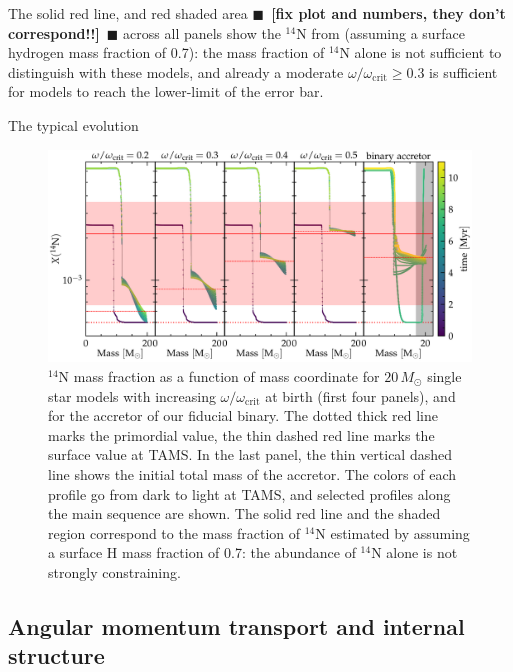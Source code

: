 \documentclass[twocolumn,twocolappendix,trackchanges]{aastex63}
\newcommand{\todo}[1]{{\large $\blacksquare$~\textbf{\color{red}[#1]}}~$\blacksquare$}
\begin{document}
The solid red line, and red shaded area \todo{fix plot and numbers,
  they don't correspond!!} across all panels show the
$^{14}\mathrm{N}$ from  (assuming a surface
hydrogen mass fraction of 0.7): the mass fraction of $^{14}\mathrm{N}$
alone is not sufficient to distinguish with these models, and already
a moderate $\omega/\omega_\mathrm{crit}\geq0.3$ is sufficient for
models to reach the lower-limit of the error bar.

The typical evolution


\begin{figure}[htbp]
  \centering
  \includegraphics[width=\textwidth]{n14_struct_complete_zeta_ab}
  \caption{$^{14}\mathrm{N}$ mass fraction as a function of mass
    coordinate for $20\,M_\odot$ single star models with increasing
    $\omega/\omega_\mathrm{crit}$ at birth (first four panels), and
    for the accretor of our fiducial binary. The dotted thick red line
    marks the primordial value, the thin dashed red line marks the
    surface value at TAMS. In the last panel, the thin vertical dashed line shows the initial total mass of the accretor. The colors of each profile go from dark to
    light at TAMS, and selected profiles along the main sequence are
    shown. The solid red line and the shaded region correspond to the
    mass fraction of $^{14}\mathrm{N}$ estimated by
     assuming a surface H mass fraction of 0.7:
    the abundance of $^{14}\mathrm{N}$ alone is not strongly constraining.}
  \label{fig:n14}
\end{figure}



\subsection{Angular momentum transport and internal structure}
\label{sec:rot}
\end{document}
